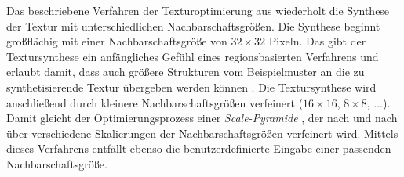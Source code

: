 Das beschriebene Verfahren der Texturoptimierung aus \cite{TextureOptimization} wiederholt die Synthese der Textur mit unterschiedlichen Nachbarschaftsgrößen.
Die Synthese beginnt großflächig mit einer Nachbarschaftsgröße von $32 \times 32$ Pixeln.
Das gibt der Textursynthese ein anfängliches Gefühl eines regionsbasierten Verfahrens und erlaubt damit, dass auch größere Strukturen vom Beispielmuster an die zu synthetisierende Textur übergeben werden können \cite{TextureOptimization}.
Die Textursynthese wird anschließend durch kleinere Nachbarschaftsgrößen verfeinert ($16 \times 16$, $8 \times 8$, ...).
Damit gleicht der Optimierungsprozess einer \emph{Scale-Pyramide} \cite{SelfTuning}, der nach und nach über verschiedene Skalierungen der Nachbarschaftsgrößen verfeinert wird.
Mittels dieses Verfahrens entfällt ebenso die benutzerdefinierte Eingabe einer passenden Nachbarschaftsgröße.
